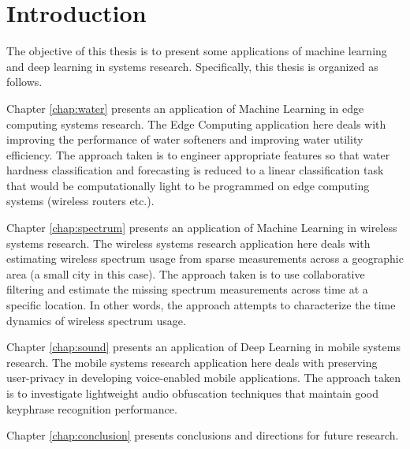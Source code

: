 \chapter{Introduction}

The objective of this thesis is to present some applications of machine learning and deep learning in systems research.
 Specifically, this thesis is organized as follows.

Chapter \ref{chap:water} presents an application of Machine Learning in edge computing systems research.
 The Edge Computing application here deals with improving the performance of water softeners and improving water utility efficiency.
 The approach taken is to engineer appropriate features so that water hardness classification and forecasting is reduced to a linear classification task that would be computationally light to be programmed on edge computing systems (wireless routers etc.).

Chapter \ref{chap:spectrum} presents an application of Machine Learning in wireless systems research.
 The wireless systems research application here deals with estimating wireless spectrum usage from sparse measurements across a geographic area (a small city in this case).
 The approach taken is to use collaborative filtering and estimate the missing spectrum measurements across time at a specific location.
 In other words, the approach attempts to characterize the time dynamics of wireless spectrum usage.

Chapter \ref{chap:sound} presents an application of Deep Learning in mobile systems research.
 The mobile systems research application here deals with preserving user-privacy in developing voice-enabled mobile applications.
 The approach taken is to investigate lightweight audio obfuscation techniques that maintain good keyphrase recognition performance.

Chapter \ref{chap:conclusion} presents conclusions and directions for future research.
